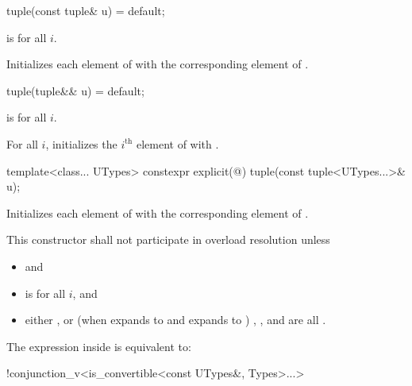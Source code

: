 %
\begin{itemdecl}
tuple(const tuple& u) = default;
\end{itemdecl}

\begin{itemdescr}
\pnum
\requires {} is  for all $i$.

\pnum
\effects
Initializes each element of  with the
corresponding element of .
\end{itemdescr}

%
\begin{itemdecl}
tuple(tuple&& u) = default;
\end{itemdecl}

\begin{itemdescr}
\pnum
\constraints
{} is  for all $i$.

\pnum
\effects
For all $i$, initializes the $i^\text{th}$ element of  with
.
\end{itemdescr}

%
\begin{itemdecl}
template<class... UTypes> constexpr explicit(@\seebelow@) tuple(const tuple<UTypes...>& u);
\end{itemdecl}

\begin{itemdescr}
\pnum
\effects
Initializes each element of 
with the corresponding element of .

\pnum
\remarks
This constructor shall not participate in overload resolution unless
\begin{itemize}
\item
{} \tcode{==}  and
\item
{} is  for all $i$, and
\item
either
, or
(when  expands to  and  expands to )
, , and  are all .
\end{itemize}
The expression inside  is equivalent to:
\begin{codeblock}
!conjunction_v<is_convertible<const UTypes&, Types>...>
\end{codeblock}
\end{itemdescr}


